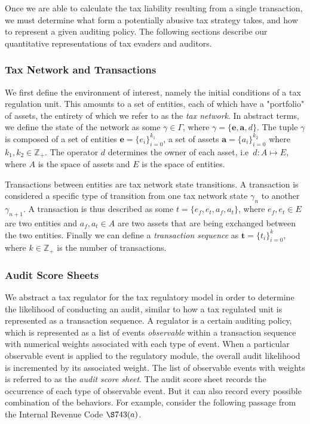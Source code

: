 Once we are able to calculate the tax liability resulting from a
single transaction, we must determine what form a potentially abusive
tax strategy takes, and how to represent a given auditing policy. The
following sections describe our quantitative representations of tax
evaders and auditors.

\subsubsection{Tax Network and Transactions}
\label{sec:transactions}

We first define the environment of interest, namely the initial
conditions of a tax regulation unit. This amounts to a set of
entities, each of which have a "portfolio" of assets, the entirety of
which we refer to as the \textit{tax network}. In abstract terms, we
define the state of the network as some $\gamma \in \Gamma$, where
$\gamma = \{\textbf{e}, \textbf{a}, d\}$. The tuple $\gamma$ is
composed of a set of entities $\textbf{e} = \{e_i\}_{i=0}^{k_1}$, a
set of assets $\textbf{a} = \{a_i\}_{i=0}^{k_2}$ where $k_1,k_2 \in
\mathbb{Z}_+$. The operator $d$ determines the owner of each asset,
i.e~$d: A \mapsto E$, where $A$ is the space of assets and $E$ is the
space of entities.

Transactions between entities are tax network state transitions. A
transaction is considered a specific type of transition from one tax
network state $\gamma_n$ to another $\gamma_{n+1}$. A transaction is
thus described as some $t=\{e_f,e_t,a_f,a_t\}$, where $e_f,e_t \in E$
are two entities and $a_f,a_t \in A$ are two assets that are being
exchanged between the two entities. Finally we can define a
\textit{transaction sequence} as $\textbf{t} = \{t_i\}_{i=0}^k$, where
$k \in \mathbb{Z}_+$ is the number of transactions.

\subsubsection{Audit Score Sheets}
\label{sec:auditscoresheets}

We abstract a tax regulator for the tax regulatory model in order to
determine the likelihood of conducting an audit, similar to how a tax
regulated unit is represented as a transaction sequence. A regulator
is a certain auditing policy, which is represented as a list of events
\textit{observable} within a transaction sequence with numerical
weights associated with each type of event. When a particular
observable event is applied to the regulatory module, the overall
audit likelihood is incremented by its associated weight. The list of
observable events with weights is referred to as the \textit{audit
  score sheet}. The audit score sheet records the occurrence of each
type of observable event. But it can also record every possible
combination of the behaviors. For example, consider the following
passage from the Internal Revenue Code $\S 743(a)$.

